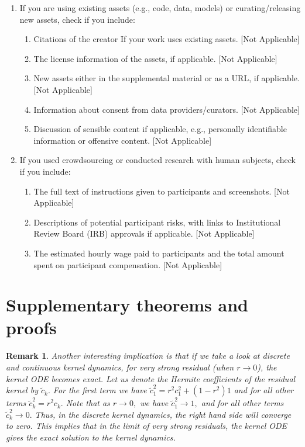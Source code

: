 \documentclass[twoside]{article}
\newtheorem{remark}{Remark}
\theoremstyle{definition}
\begin{document}
\begin{enumerate}
 \item If you are using existing assets (e.g., code, data, models) or curating/releasing new assets, check if you include:
 \begin{enumerate}
   \item Citations of the creator If your work uses existing assets. [Not Applicable]
   \item The license information of the assets, if applicable. [Not Applicable]
   \item New assets either in the supplemental material or as a URL, if applicable. [Not Applicable]
   \item Information about consent from data providers/curators. [Not Applicable]
   \item Discussion of sensible content if applicable, e.g., personally identifiable information or offensive content. [Not Applicable]
 \end{enumerate}

 \item If you used crowdsourcing or conducted research with human subjects, check if you include:
 \begin{enumerate}
   \item The full text of instructions given to participants and screenshots. [Not Applicable]
   \item Descriptions of potential participant risks, with links to Institutional Review Board (IRB) approvals if applicable. [Not Applicable]
   \item The estimated hourly wage paid to participants and the total amount spent on participant compensation. [Not Applicable]
 \end{enumerate}

 \end{enumerate}

\appendix
\renewcommand{\theremark}{\thesection.\arabic{remark}}
\renewcommand{\thefigure}{\thesection.\arabic{figure}}
\renewcommand{\thetheorem}{\thesection.\arabic{theorem}}
\renewcommand{\thecorollary}{\thesection.\arabic{corollary}}
\renewcommand{\thecorollary}{\thesection.\arabic{lemma}}



\section{Supplementary theorems and proofs}\label{sec:proofs}

\begin{remark}\label{rem:residual_ODE}
    Another interesting implication is that if we take a look at discrete and continuous kernel dynamics, for very strong residual (when $r\to 0$), the kernel ODE becomes exact. Let us denote the Hermite coefficients of the residual kernel by $\tilde{c}_k.$ For the first term we have $\tilde{c}_1^2 = r^2 c_1^2 + (1-r^2) 1$ and for all other terms $\tilde{c}_k^2 = r^2 c_k.$ Note that as $r \to 0,$ we have $\tilde{c}_1^2\to 1,$ and for all other terms $\tilde{c}_k^2\to 0.$ Thus, in the discrete kernel dynamics, the right hand side will converge to zero. This implies that in the limit of very strong residuals, the kernel ODE gives the exact solution to the kernel dynamics. 
\end{remark}
\end{document}
